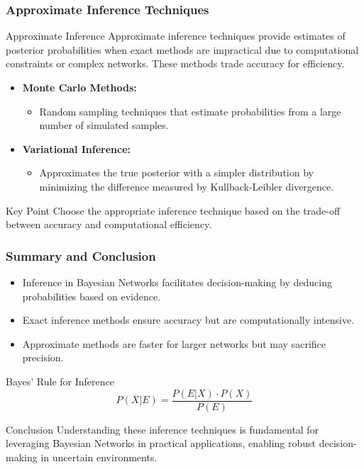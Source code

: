 \documentclass[aspectratio=169]{beamer}
\begin{document}
\begin{frame}[fragile]
    \frametitle{Approximate Inference Techniques}
    \begin{block}{Approximate Inference}
        Approximate inference techniques provide estimates of posterior probabilities when exact methods are impractical due to computational constraints or complex networks. 
        These methods trade accuracy for efficiency.
    \end{block}

    \begin{itemize}
        \item \textbf{Monte Carlo Methods:}
        \begin{itemize}
            \item Random sampling techniques that estimate probabilities from a large number of simulated samples.
        \end{itemize}
        
        \item \textbf{Variational Inference:}
        \begin{itemize}
            \item Approximates the true posterior with a simpler distribution by minimizing the difference measured by Kullback-Leibler divergence.
        \end{itemize}
    \end{itemize}

    \begin{block}{Key Point}
        Choose the appropriate inference technique based on the trade-off between accuracy and computational efficiency.
    \end{block}
\end{frame}

\begin{frame}[fragile]
    \frametitle{Summary and Conclusion}
    \begin{itemize}
        \item Inference in Bayesian Networks facilitates decision-making by deducing probabilities based on evidence.
        \item Exact inference methods ensure accuracy but are computationally intensive.
        \item Approximate methods are faster for larger networks but may sacrifice precision.
    \end{itemize}

    \begin{block}{Bayes' Rule for Inference}
        \[
        P(X | E) = \frac{P(E | X) \cdot P(X)}{P(E)}
        \]
    \end{block}

    \begin{block}{Conclusion}
        Understanding these inference techniques is fundamental for leveraging Bayesian Networks in practical applications, enabling robust decision-making in uncertain environments.
    \end{block}
\end{frame}
\end{document}
